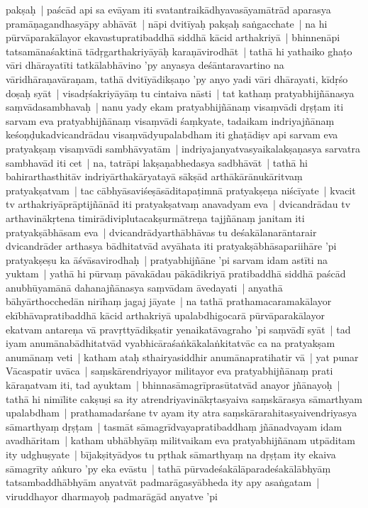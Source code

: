 \documentclass[article,a4paper]{memoir}
\begin{document}
pakṣaḥ | paścā\-d api sa evā\-yam iti svatantraikā\-dhyavasā\-yamā\-trā\-d aparasya pramā\-ṇagandhasyā\-py abhā\-vā\-t | \label{thakur75-117.6} nā\-pi dvitī\-yaḥ pakṣaḥ saṅgacchate | na hi pū\-rvā\-parakā\-layor ekavastupratibaddhā\- siddhā\- kā\-cid arthakriyā\- | bhinnenā\-pi tatsamā\-naśaktinā\- tā\-dṛgarthakriyā\-yā\-ḥ karaṇā\-virodhā\-t | tathā\- hi yathaiko ghaṭo vā\-ri dhā\-rayatī\-ti tatkā\-labhā\-vino 'py anyasya deśā\-ntaravartino na vā\-ridhā\-raṇavā\-raṇam, tathā\- dvitī\-yā\-dikṣaṇo 'py anyo yadi vā\-ri dhā\-rayati, kī\-dṛśo doṣaḥ syā\-t | visadṛśakriyā\-yā\-ṃ tu cintaiva nā\-sti | tat kathaṃ pratyabhijñā\-nasya saṃvā\-dasambhavaḥ | \label{thakur75-117.12} nanu yady ekam pratyabhijñā\-naṃ visaṃvā\-di dṛṣṭam iti sarvam eva pratyabhijñā\-naṃ visaṃvā\-di śaṃkyate, tadaikam indriyajñā\-naṃ keśoṇḍukadvicandrā\-dau visaṃvā\-dyupalabdham iti ghaṭā\-diṣv api sarvam eva pratyakṣaṃ visaṃvā\-di sambhā\-vyatā\-m | indriyajanyatvasyaikalakṣaṇasya sarvatra sambhavā\-d iti cet | \label{thakur75-117.15} na, tatrā\-pi lakṣaṇabhedasya sadbhā\-vā\-t | tathā\- hi bahirarthasthitā\-v indriyā\-rthakā\-ryatayā\- sā\-kṣā\-d arthā\-kā\-rā\-nukā\-ritvaṃ pratyakṣatvam | tac cā\-bhyā\-saviśeṣā\-sā\-ditapaṭimnā\- pratyakṣeṇa niścī\-yate | kvacit tv arthakriyā\-prā\-ptijñā\-nā\-d iti pratyakṣatvaṃ anavadyam eva | dvicandrā\-dau tv arthavinā\-kṛtena timirā\-diviplutacakṣurmā\-treṇa tajjñā\-naṃ janitam iti pratyakṣā\-bhā\-sam eva | dvicandrā\-dyarthā\-bhā\-vas tu deśakā\-lanarā\-ntarair dvicandrā\-der arthasya bā\-dhitatvā\-d avyā\-hata iti pratyakṣā\-bhā\-sapariihā\-re 'pi pratyakṣeṣu ka ā\-śvā\-savirodhaḥ | \label{thakur75-117.21} pratyabhijñā\-ne 'pi sarvam idam astī\-ti na yuktam | yathā\- hi pū\-rvaṃ pā\-vakā\-dau pā\-kā\-dikriyā\- pratibaddhā\- siddhā\- paścā\-d anubhū\-yamā\-nā\- dahanajñā\-nasya saṃvā\-dam ā\-vedayati | anyathā\- bā\-hyā\-rthocchedā\-n nirī\-haṃ jagaj jā\-yate | na tathā\- prathamacaramakā\-layor ekī\-bhā\-vapratibaddhā\- kā\-cid arthakriyā\- upalabdhigocarā\- pū\-rvā\-parakā\-layor ekatvam antareṇa vā\- pravṛttyā\-dikṣatir yenaikatā\-vagraho 'pi saṃvā\-dī\- syā\-t | \label{thakur75-117.26} tad iyam anumā\-nabā\-dhitatvā\-d vyabhicā\-raśaṅkā\-kalaṅkitatvā\-c ca na pratyakṣam anumā\-naṃ veti | katham ataḥ sthairyasiddhir anumā\-napratihatir vā\- | \label{thakur75-117.28} yat punar Vā\-caspatir uvā\-ca | saṃskā\-rendriyayor militayor eva pratyabhijñā\-naṃ prati kā\-raṇatvam iti, tad ayuktam | bhinnasā\-magrī\-prasū\-tatvā\-d anayor jñā\-nayoḥ | tathā\- hi nimī\-lite cakṣuṣi sa ity atrendriyavinā\-kṛtasyaiva saṃskā\-rasya sā\-marthyam upalabdham | prathamadarśane tv ayam ity atra saṃskā\-rarahitasyaivendriyasya sā\-marthyaṃ dṛṣṭam | tasmā\-t sā\-magrī\-dvayapratibaddhaṃ jñā\-nadvayam idam avadhā\-ritam | katham ubhā\-bhyā\-ṃ militvaikam eva pratyabhijñā\-nam utpā\-ditam ity udghuṣyate | bī\-jakṣityā\-dyos tu pṛthak sā\-marthyaṃ na dṛṣṭam ity ekaiva sā\-magrī\-ty aṅkuro 'py eka evā\-stu | \label{thakur75-118.3} tathā\- pū\-rvadeśakā\-lā\-paradeśakā\-lā\-bhyā\-ṃ tatsambaddhā\-bhyā\-m anyatvā\-t padmarā\-gasyā\-bheda ity apy asaṅgatam | viruddhayor dharmayoḥ padmarā\-gā\-d anyatve 'pi 
\end{document}
